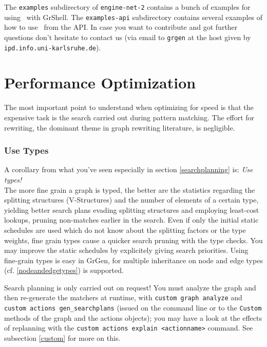 The \texttt{examples} subdirectory of \texttt{engine-net-2} contains a bunch of examples for using \GrG~with GrShell.
The \texttt{examples-api} subdirectory contains several examples of how to use \GrG~from the API.
In case you want to contribute and got further questions don't hesitate to contact us 
(via email to \texttt{grgen} at the host given by \texttt{ipd.info.uni-karlsruhe.de}).


\section{Performance Optimization}\label{sec:performance} 

The most important point to understand when optimizing for speed is that the expensive task is the search carried out during pattern matching. The effort for rewriting, the dominant theme in graph rewriting literature, is negligible.

\subsubsection*{Use Types}
A corollary from what you've seen especially in section \ref{searchplanning} is: \emph{Use types!}\\
The more fine grain a graph is typed, the better are the statistics regarding the splitting structures (V-Structures) and the number of elements of a certain type, yielding better search plans evading splitting structures and employing least-cost lookups, pruning non-matches earlier in the search.
Even if only the initial static schedules are used which do not know about the splitting factors or the type weights, fine grain types cause a quicker search pruning with the type checks.
You may improve the static schedules by explicitely giving search priorities.
Using fine-grain types is easy in GrGen, for multiple inheritance on node and edge types (cf. \ref{nodeandedgetypes}) is supported.

\begin{warning}
Search planning is only carried out on request!
You must analyze the graph and then re-generate the matchers at runtime,
with \texttt{custom graph analyze} and \texttt{custom actions gen\_searchplans} (issued on the command line or to the \texttt{Custom} methods of the graph and the actions objects);
you may have a look at the effects of replanning with the \texttt{custom actions explain <actionname>} command.
See subsection \ref{custom} for more on this.
\end{warning}

